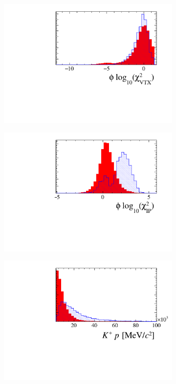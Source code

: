 \begin{figure}[!h]
\begin{subfigure}[t]{0.22\textwidth}
      \centering
      \includegraphics[width=1.0\textwidth]{figs/Selection/Phi_BDT_Var_Ds2KKPi_log10_Phi_ENDVERTEX_CHI2.pdf}
   \end{subfigure}
   \begin{subfigure}[t]{0.22\textwidth}
      \centering
      \includegraphics[width=1.0\textwidth]{figs/Selection/Phi_BDT_Var_Ds2KKPi_log10_Phi_IPCHI2_OWNPV.pdf}
   \end{subfigure}
   \begin{subfigure}[t]{0.22\textwidth}
      \centering
      \includegraphics[width=1.0\textwidth]{figs/Selection/Phi_BDT_Var_Ds2KKPi_Phi_K0_P.pdf}

\end{subfigure}
\end{figure}
